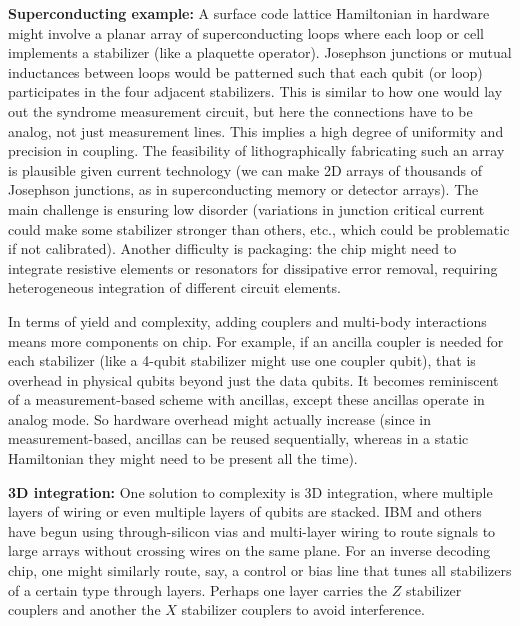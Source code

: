 \documentclass[11pt]{article}
\begin{document}
\textbf{Superconducting example:} A surface code lattice Hamiltonian in hardware might involve a planar array of superconducting loops where each loop or cell implements a stabilizer (like a plaquette operator). Josephson junctions or mutual inductances between loops would be patterned such that each qubit (or loop) participates in the four adjacent stabilizers. This is similar to how one would lay out the syndrome measurement circuit, but here the connections have to be analog, not just measurement lines. This implies a high degree of uniformity and precision in coupling. The feasibility of lithographically fabricating such an array is plausible given current technology (we can make 2D arrays of thousands of Josephson junctions, as in superconducting memory or detector arrays). The main challenge is ensuring low disorder (variations in junction critical current could make some stabilizer stronger than others, etc., which could be problematic if not calibrated). Another difficulty is packaging: the chip might need to integrate resistive elements or resonators for dissipative error removal, requiring heterogeneous integration of different circuit elements.

In terms of yield and complexity, adding couplers and multi-body interactions means more components on chip. For example, if an ancilla coupler is needed for each stabilizer (like a 4-qubit stabilizer might use one coupler qubit), that is overhead in physical qubits beyond just the data qubits. It becomes reminiscent of a measurement-based scheme with ancillas, except these ancillas operate in analog mode. So hardware overhead might actually increase (since in measurement-based, ancillas can be reused sequentially, whereas in a static Hamiltonian they might need to be present all the time).

\textbf{3D integration:} One solution to complexity is 3D integration, where multiple layers of wiring or even multiple layers of qubits are stacked. IBM and others have begun using through-silicon vias and multi-layer wiring to route signals to large arrays without crossing wires on the same plane. For an inverse decoding chip, one might similarly route, say, a control or bias line that tunes all stabilizers of a certain type through layers. Perhaps one layer carries the $Z$ stabilizer couplers and another the $X$ stabilizer couplers to avoid interference.
\end{document}
